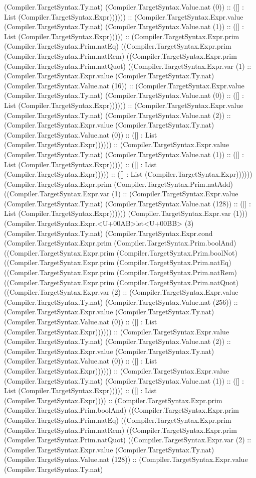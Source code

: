 \documentclass[11pt]{article}
\begin{document}
(Compiler.TargetSyntax.Ty.nat) (Compiler.TargetSyntax.Value.nat (0)) :: ([] : List (Compiler.TargetSyntax.Expr)))))) :: (Compiler.TargetSyntax.Expr.value (Compiler.TargetSyntax.Ty.nat) (Compiler.TargetSyntax.Value.nat (1)) :: ([] : List (Compiler.TargetSyntax.Expr))))) :: (Compiler.TargetSyntax.Expr.prim (Compiler.TargetSyntax.Prim.natEq) ((Compiler.TargetSyntax.Expr.prim (Compiler.TargetSyntax.Prim.natRem) ((Compiler.TargetSyntax.Expr.prim (Compiler.TargetSyntax.Prim.natQuot) ((Compiler.TargetSyntax.Expr.var (1) :: (Compiler.TargetSyntax.Expr.value (Compiler.TargetSyntax.Ty.nat) (Compiler.TargetSyntax.Value.nat (16)) :: (Compiler.TargetSyntax.Expr.value (Compiler.TargetSyntax.Ty.nat) (Compiler.TargetSyntax.Value.nat (0)) :: ([] : List (Compiler.TargetSyntax.Expr)))))) :: (Compiler.TargetSyntax.Expr.value (Compiler.TargetSyntax.Ty.nat) (Compiler.TargetSyntax.Value.nat (2)) :: (Compiler.TargetSyntax.Expr.value (Compiler.TargetSyntax.Ty.nat) (Compiler.TargetSyntax.Value.nat (0)) :: ([] : List (Compiler.TargetSyntax.Expr)))))) :: (Compiler.TargetSyntax.Expr.value (Compiler.TargetSyntax.Ty.nat) (Compiler.TargetSyntax.Value.nat (1)) :: ([] : List (Compiler.TargetSyntax.Expr))))) :: ([] : List (Compiler.TargetSyntax.Expr))))) :: ([] : List (Compiler.TargetSyntax.Expr)))))) (Compiler.TargetSyntax.Expr.prim (Compiler.TargetSyntax.Prim.natAdd) ((Compiler.TargetSyntax.Expr.var (1) :: (Compiler.TargetSyntax.Expr.value (Compiler.TargetSyntax.Ty.nat) (Compiler.TargetSyntax.Value.nat (128)) :: ([] : List (Compiler.TargetSyntax.Expr)))))) (Compiler.TargetSyntax.Expr.var (1))) (Compiler.TargetSyntax.Expr.<U+00AB>let<U+00BB> (3) (Compiler.TargetSyntax.Ty.nat) (Compiler.TargetSyntax.Expr.cond (Compiler.TargetSyntax.Expr.prim (Compiler.TargetSyntax.Prim.boolAnd) ((Compiler.TargetSyntax.Expr.prim (Compiler.TargetSyntax.Prim.boolNot) ((Compiler.TargetSyntax.Expr.prim (Compiler.TargetSyntax.Prim.natEq) ((Compiler.TargetSyntax.Expr.prim (Compiler.TargetSyntax.Prim.natRem) ((Compiler.TargetSyntax.Expr.prim (Compiler.TargetSyntax.Prim.natQuot) ((Compiler.TargetSyntax.Expr.var (2) :: (Compiler.TargetSyntax.Expr.value (Compiler.TargetSyntax.Ty.nat) (Compiler.TargetSyntax.Value.nat (256)) :: (Compiler.TargetSyntax.Expr.value (Compiler.TargetSyntax.Ty.nat) (Compiler.TargetSyntax.Value.nat (0)) :: ([] : List (Compiler.TargetSyntax.Expr)))))) :: (Compiler.TargetSyntax.Expr.value (Compiler.TargetSyntax.Ty.nat) (Compiler.TargetSyntax.Value.nat (2)) :: (Compiler.TargetSyntax.Expr.value (Compiler.TargetSyntax.Ty.nat) (Compiler.TargetSyntax.Value.nat (0)) :: ([] : List (Compiler.TargetSyntax.Expr)))))) :: (Compiler.TargetSyntax.Expr.value (Compiler.TargetSyntax.Ty.nat) (Compiler.TargetSyntax.Value.nat (1)) :: ([] : List (Compiler.TargetSyntax.Expr))))) :: ([] : List (Compiler.TargetSyntax.Expr)))) :: (Compiler.TargetSyntax.Expr.prim (Compiler.TargetSyntax.Prim.boolAnd) ((Compiler.TargetSyntax.Expr.prim (Compiler.TargetSyntax.Prim.natEq) ((Compiler.TargetSyntax.Expr.prim (Compiler.TargetSyntax.Prim.natRem) ((Compiler.TargetSyntax.Expr.prim (Compiler.TargetSyntax.Prim.natQuot) ((Compiler.TargetSyntax.Expr.var (2) :: (Compiler.TargetSyntax.Expr.value (Compiler.TargetSyntax.Ty.nat) (Compiler.TargetSyntax.Value.nat (128)) :: (Compiler.TargetSyntax.Expr.value (Compiler.TargetSyntax.Ty.nat) 
\end{document}
